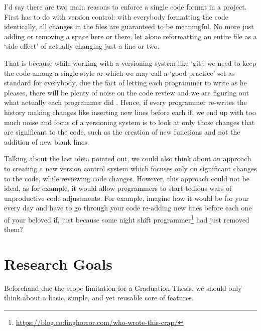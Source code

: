 \begin{citacao}
I'd say there are two main reasons to enforce a single code format in a project. First has
to do with version control: with everybody formatting the code identically, all changes in
the files are guaranteed to be meaningful. No more just adding or removing a space here or
there, let alone reformatting an entire file as a `side effect' of actually changing just a
line or two. \cite{Geukens}
\end{citacao}

That is because while working with a versioning system like `git', we need
to keep the code among a single style or which we may call a `good practice'
set as standard for everybody, due the fact of letting each programmer to
write as he pleases, there will be plenty of noise on the code review and we
are figuring out what actually each programmer did \cite{quitDiffCalculating}.
Hence, if every programmer re-writes the history making changes
like inserting new lines
before each if, we end up with too much noise and focus of a versioning
system is to look at only those changes that are significant to the code,
such as the creation of new functions and not the addition of new blank
lines. \cite{findingRegressionsInProjects}

Talking about the last ideia pointed out, we could also think about an
approach to creating a new version control system which focuses only on
significant changes to the code, while reviewing code changes. However, this
approach could not be ideal, as for example, it would allow programmers to
start tedious wars of unproductive code adjustments. For example, imagine
how it would be for your every day and have to go through your code
re-adding new lines before each one of your beloved if\s, just because some
night shift programmer\footnote{\url{https://blog.codinghorror.com/who-wrote-this-crap/}}
had just removed them?



\section{Research Goals}

Beforehand due the scope limitation for a Graduation Thesis,
we should only think about a basic, simple,
and yet reusable core of features.

